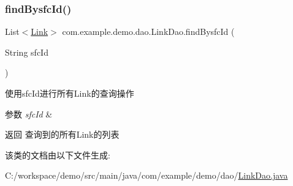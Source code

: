 \subsubsection{\texorpdfstring{find\+Bysfc\+Id()}{findBysfcId()}}
{\footnotesize\ttfamily List$<$\mbox{\hyperlink{classcom_1_1example_1_1demo_1_1modular_1_1_link}{Link}}$>$ com.\+example.\+demo.\+dao.\+Link\+Dao.\+find\+Bysfc\+Id (\begin{DoxyParamCaption}\item[{String}]{sfc\+Id }\end{DoxyParamCaption})}

使用sfc\+Id进行所有\+Link的查询操作 
\begin{DoxyParams}{参数}
{\em sfc\+Id} & \\
\hline
\end{DoxyParams}
\begin{DoxyReturn}{返回}
查询到的所有\+Link的列表 
\end{DoxyReturn}


该类的文档由以下文件生成\+:\begin{DoxyCompactItemize}
\item 
C\+:/workspace/demo/src/main/java/com/example/demo/dao/\mbox{\hyperlink{_link_dao_8java}{Link\+Dao.\+java}}\end{DoxyCompactItemize}
